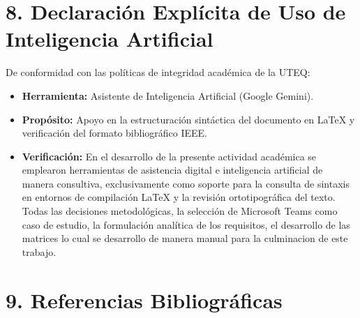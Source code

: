 \documentclass[11pt,a4paper]{article}
\begin{document}
	\section*{\textbf{8. Declaración Explícita de Uso de Inteligencia Artificial}}
	De conformidad con las políticas de integridad académica de la UTEQ:
	\begin{itemize}
		\item \textbf{Herramienta:} Asistente de Inteligencia Artificial (Google Gemini).
		\item \textbf{Propósito:} Apoyo en la estructuración sintáctica del documento en LaTeX y verificación del formato bibliográfico IEEE.
		\item \textbf{Verificación:} En el desarrollo de la presente actividad académica se emplearon herramientas de asistencia digital e inteligencia artificial de manera consultiva, exclusivamente como soporte para la consulta de sintaxis en entornos de compilación LaTeX y la revisión ortotipográfica del texto. Todas las decisiones metodológicas, la selección de Microsoft Teams como caso de estudio, la formulación analítica de los requisitos, el desarrollo de las matrices lo cual se desarrollo de manera manual  para la culminacion de este trabajo.
	\end{itemize}
	
	\section*{\textbf{9. Referencias Bibliográficas}}
	
	
	
\end{document}
